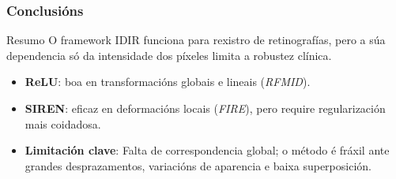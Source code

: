 \documentclass[xcolor=dvipsnames]{beamer}
\begin{document}
\begin{frame}
    \frametitle{Conclusións}

    \begin{block}{Resumo}
        O framework IDIR funciona para rexistro de retinografías, pero a súa dependencia só da intensidade dos píxeles limita a robustez clínica.
    \end{block}

    \begin{itemize}
        \item \textbf{ReLU}: boa en transformacións globais e lineais (\textit{RFMID}).
        \item \textbf{SIREN}: eficaz en deformacións locais (\textit{FIRE}), pero require regularización mais coidadosa.
        \item \textbf{Limitación clave}: Falta de correspondencia global; o método é fráxil ante grandes desprazamentos, variacións de aparencia e baixa superposición.
    \end{itemize}

    \end{frame}
\end{document}
